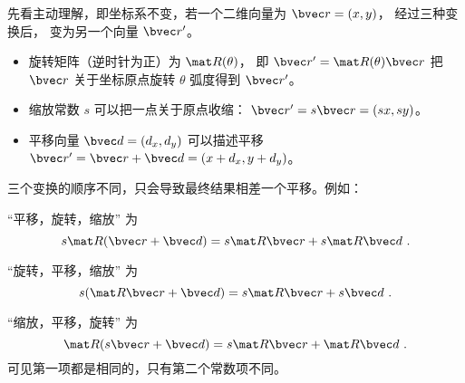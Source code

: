 

先看主动理解，即坐标系不变，若一个二维向量为 $\bvec r = (x, y)$， 经过三种变换后， 变为另一个向量 $\bvec r'$。

\begin{itemize}
\item 旋转矩阵（逆时针为正）为 $\mat R(\theta)$， 即 $\bvec r' = \mat R(\theta)\bvec r$ 把 $\bvec r$ 关于坐标原点旋转 $\theta$ 弧度得到 $\bvec r'$。
\item 缩放常数 $s$ 可以把一点关于原点收缩： $\bvec r' = s\bvec r = (sx, sy)$。
\item 平移向量 $\bvec d = (d_x,d_y)$ 可以描述平移 $\bvec r' = \bvec r + \bvec d = (x+d_x,y+d_y)$。
\end{itemize}

三个变换的顺序不同，只会导致最终结果相差一个平移。例如：

“平移，旋转，缩放” 为
\begin{equation}
s\mat R (\bvec r + \bvec d) = s\mat R\bvec r + s\mat R\bvec d~.
\end{equation}

“旋转，平移，缩放” 为
\begin{equation}
s(\mat R\bvec r + \bvec d) = s\mat R\bvec r + s\bvec d~.
\end{equation}

“缩放，平移，旋转” 为
\begin{equation}
\mat R(s\bvec r + \bvec d) = s\mat R\bvec r + \mat R\bvec d~.
\end{equation}
可见第一项都是相同的，只有第二个常数项不同。

